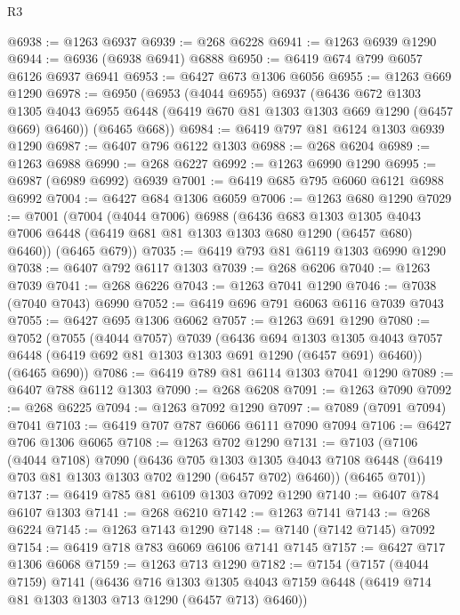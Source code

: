 \begin{lexlean}{R3}
\begin{coremodule}
@6938 := @1263 @6937
@6939 := @268 @6228
@6941 := @1263 @6939 @1290
@6944 := @6936 (@6938 @6941) @6888
@6950 := @6419 @674 @799 @6057 @6126 @6937 @6941
@6953 := @6427 @673 @1306 @6056
@6955 := @1263 @669 @1290
@6978 := @6950
    (@6953
      (@4044 @6955)
      @6937
      (@6436
        @672
        @1303
        @1305
        @4043
        @6955
        @6448
        (@6419 @670 @81 @1303 @1303 @669 @1290 (@6457 @669) @6460))
      (@6465 @668))
@6984 := @6419 @797 @81 @6124 @1303 @6939 @1290
@6987 := @6407 @796 @6122 @1303
@6988 := @268 @6204
@6989 := @1263 @6988
@6990 := @268 @6227
@6992 := @1263 @6990 @1290
@6995 := @6987 (@6989 @6992) @6939
@7001 := @6419 @685 @795 @6060 @6121 @6988 @6992
@7004 := @6427 @684 @1306 @6059
@7006 := @1263 @680 @1290
@7029 := @7001
    (@7004
      (@4044 @7006)
      @6988
      (@6436
        @683
        @1303
        @1305
        @4043
        @7006
        @6448
        (@6419 @681 @81 @1303 @1303 @680 @1290 (@6457 @680) @6460))
      (@6465 @679))
@7035 := @6419 @793 @81 @6119 @1303 @6990 @1290
@7038 := @6407 @792 @6117 @1303
@7039 := @268 @6206
@7040 := @1263 @7039
@7041 := @268 @6226
@7043 := @1263 @7041 @1290
@7046 := @7038 (@7040 @7043) @6990
@7052 := @6419 @696 @791 @6063 @6116 @7039 @7043
@7055 := @6427 @695 @1306 @6062
@7057 := @1263 @691 @1290
@7080 := @7052
    (@7055
      (@4044 @7057)
      @7039
      (@6436
        @694
        @1303
        @1305
        @4043
        @7057
        @6448
        (@6419 @692 @81 @1303 @1303 @691 @1290 (@6457 @691) @6460))
      (@6465 @690))
@7086 := @6419 @789 @81 @6114 @1303 @7041 @1290
@7089 := @6407 @788 @6112 @1303
@7090 := @268 @6208
@7091 := @1263 @7090
@7092 := @268 @6225
@7094 := @1263 @7092 @1290
@7097 := @7089 (@7091 @7094) @7041
@7103 := @6419 @707 @787 @6066 @6111 @7090 @7094
@7106 := @6427 @706 @1306 @6065
@7108 := @1263 @702 @1290
@7131 := @7103
    (@7106
      (@4044 @7108)
      @7090
      (@6436
        @705
        @1303
        @1305
        @4043
        @7108
        @6448
        (@6419 @703 @81 @1303 @1303 @702 @1290 (@6457 @702) @6460))
      (@6465 @701))
@7137 := @6419 @785 @81 @6109 @1303 @7092 @1290
@7140 := @6407 @784 @6107 @1303
@7141 := @268 @6210
@7142 := @1263 @7141
@7143 := @268 @6224
@7145 := @1263 @7143 @1290
@7148 := @7140 (@7142 @7145) @7092
@7154 := @6419 @718 @783 @6069 @6106 @7141 @7145
@7157 := @6427 @717 @1306 @6068
@7159 := @1263 @713 @1290
@7182 := @7154
    (@7157
      (@4044 @7159)
      @7141
      (@6436
        @716
        @1303
        @1305
        @4043
        @7159
        @6448
        (@6419 @714 @81 @1303 @1303 @713 @1290 (@6457 @713) @6460))

\end{coremodule}
\end{lexlean}
